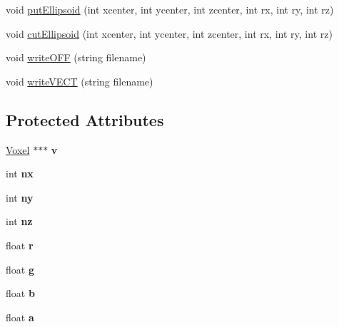\begin{DoxyCompactItemize}
\item 
void \mbox{\hyperlink{classSculptor_a093615b0c2b9b3a17a56300b9b939f39}{put\+Ellipsoid}} (int xcenter, int ycenter, int zcenter, int rx, int ry, int rz)
\item 
void \mbox{\hyperlink{classSculptor_a18d2922c111c4c13653ee07d878151ad}{cut\+Ellipsoid}} (int xcenter, int ycenter, int zcenter, int rx, int ry, int rz)
\item 
void \mbox{\hyperlink{classSculptor_a4faae5ab2d72f2f682005f468e7e8a92}{write\+O\+FF}} (string filename)
\item 
void \mbox{\hyperlink{classSculptor_a200442de17ed45b7a1ece728145a2ddf}{write\+V\+E\+CT}} (string filename)
\end{DoxyCompactItemize}
\subsection*{Protected Attributes}
\begin{DoxyCompactItemize}
\item 
\mbox{\label{classSculptor_a4ca53a2f2fbf41ca42dfe729ebe693f1}} 
\mbox{\hyperlink{structVoxel}{Voxel}} $\ast$$\ast$$\ast$ {\bfseries v}
\item 
\mbox{\label{classSculptor_ad1e32f9042538419a3bc7b376f7813b8}} 
int {\bfseries nx}
\item 
\mbox{\label{classSculptor_a1ce2ff97ec94927928ab3f5ec4ba6761}} 
int {\bfseries ny}
\item 
\mbox{\label{classSculptor_a33204e7df26a7ee4c7192381a24335d3}} 
int {\bfseries nz}
\item 
\mbox{\label{classSculptor_a3f5d2ec3b66d645019b8d81c810a1cd8}} 
float {\bfseries r}
\item 
\mbox{\label{classSculptor_a208c06af69a81a1568df4493868816f1}} 
float {\bfseries g}
\item 
\mbox{\label{classSculptor_a7aafd7305ea634252d8288b60536cd96}} 
float {\bfseries b}
\item 
\mbox{\label{classSculptor_a6fd0157dcf17582f0edd5fddf157604e}} 
float {\bfseries a}
\end{DoxyCompactItemize}


